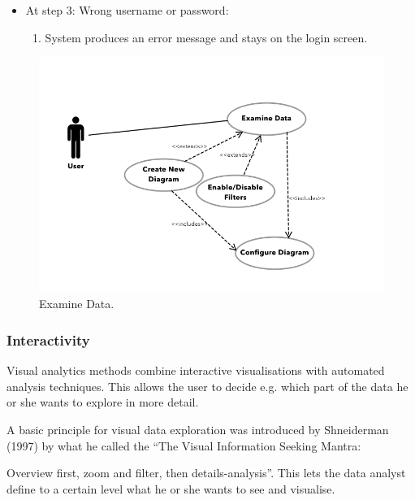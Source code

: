 \documentclass[twoside, english, final]{Pflichtenheft}
\begin{document}
\begin{description}
\begin{description}
\begin{itemize}
			            \item[]At step 3: Wrong username or password:
			                  \begin{enumerate}
				                  \item{System produces an error message and stays on the login screen.}
			                  \end{enumerate}

		            \end{itemize}
	      \end{description}

	      \begin{figure}[h]
		      \centering
		      \includegraphics[width=\textwidth]{Images/case_examine_data.png}
		      \caption{Examine Data.}
	      \end{figure}
\end{description}


\subsubsection{Interactivity}

Visual analytics methods combine interactive visualisations with automated analysis
techniques. This allows the user to decide e.g. which part
of the data he or she wants to explore in more detail.

A basic principle for visual data exploration was introduced by Shneiderman (1997) by what he called the “The Visual Information Seeking Mantra:

Overview first, zoom and filter, then details-analysis”.
This lets the data analyst define to a certain level what he or she wants
to see and visualise.
\end{document}
